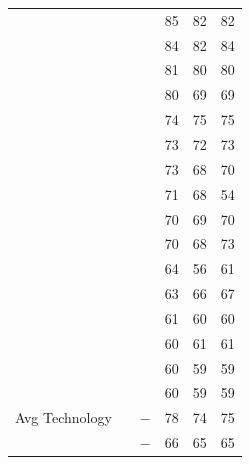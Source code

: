 \documentclass[9pt,hyperref]{article} %
\begin{document}
\begin{enumerate}[resume]
{{{\begin{minipage}{.4\linewidth}
\begin{adjustbox}{max width=\linewidth}
\begin{tabular}{@{}lccHHH}
								\OneMSevILUMg               &  &    \Mg    & 85                       & 82      & 82      \\
								\OneMSevILU                 &  &   \NoMg   & 84                       & 82      & 84      \\
								\NMIAMg                     &  &    \Mg    & 81                       & 80      & 80      \\
								\NMIA                       &  &   \NoMg   & 80                       & 69      & 69      \\
								\OneMSevILUThreeMg          &  &    \Mg    & 74                       & 75      & 75      \\
								\NMIAMgCE                   &  &    \Mg    & 73                       & 72      & 73      \\
								\NAIMg                      &  &    \Mg    & 73                       & 68      & 70      \\
								\BzCNMg                     &  &    \Mg    & 71                       & 68      & 54      \\
								\OneMSevMgCE                &  &    \Mg    & 70                       & 69      & 70      \\
								\CMCTMg                     &  &    \Mg    & 70                       & 68      & 73      \\
								\OneMSevILUThree            &  &   \NoMg   & 64                       & 56      & 61      \\
								\DMSMg                      &  &    \Mg    & 63                       & 66      & 67      \\
								\NMIACE                     &  &   \NoMg   & 61                       & 60      & 60      \\
								\OneMSevCE                  &  &   \NoMg   & 60                       & 61      & 61      \\
								\BzCN                       &  &   \NoMg   & 60                       & 59      & 59      \\
								\NAICE                      &  &   \NoMg   & 60                       & 59      & 59      \\ \midrule
								Avg Technology              &          &  $-$  & 78                       & 74      & 75      \\
								&          &  $-$  & 66                       & 65      & 65      \\

\end{tabular}
\end{adjustbox}
\end{minipage}}}}
\end{enumerate}
\end{document}
